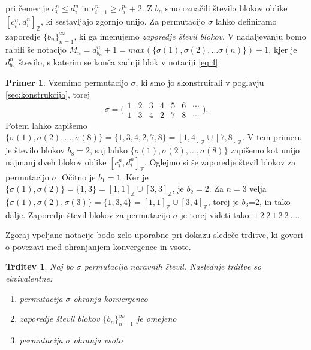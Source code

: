 \documentclass[12pt,a4paper,reqno]{amsart}
\theoremstyle{definition} %
\newtheorem{primer}[definicija]{Primer}
\theoremstyle{plain} %
\newtheorem{trditev}[definicija]{Trditev}
\newcommand{\Z}{\mathbb Z}
\begin{document}
pri čemer je $c^n_i \leq d^n_i$ in $c^n_{i+1} \geq d^n_i +2$. Z $b_n$ smo označili število blokov oblike $[c^n_i, d^n_i]_{\Z}$, ki sestavljajo zgornjo unijo. Za permutacijo $\sigma$ lahko definiramo zaporedje $\{b_n\}^{\infty}_{n=1}$, ki ga imenujemo \emph{zaporedje števil blokov}. %
V nadaljevanju bomo rabili še notacijo $M_n=d^n_{b_n}+1=max(\{ \sigma (1), \sigma (2), \ldots \sigma (n) \})+1$, kjer je $d^n_{b_n}$ število, s katerim se konča zadnji blok v notaciji \ref{eq:4}.

\begin{primer}
Vzemimo permutacijo $\sigma$, ki smo jo skonstruirali v poglavju \ref{sec:konstrukcija}, torej $$\sigma = \bigg(\begin{matrix}
    1 & 2 & 3 & 4 & 5 & 6 & \cdots   \\   1 & 3 & 4 & 2 & 7 & 8 & \cdots
  \end{matrix}\bigg).$$ Potem lahko zapišemo $\{\sigma(1), \sigma(2), \ldots, \sigma(8) \} = \{ 1,3,4,2,7,8\} = [1,4]_{\Z} \cup [7,8]_{\Z}$. V tem primeru je število blokov $b_8=2$, saj lahko $\{\sigma(1), \sigma(2), \ldots, \sigma(8) \}$ zapišemo kot unijo najmanj dveh blokov oblike  $[c^n_i, d^n_i]_{\Z}$.
Oglejmo si še zaporedje števil blokov za permutacijo $\sigma$. Očitno je $b_1=1$. Ker je $\{\sigma(1), \sigma(2) \} = \{ 1,3\} = [1,1]_{\Z} \cup [3,3]_{\Z}$, je $b_2=2$. Za $n=3$ velja $\{\sigma(1), \sigma(2), \sigma(3) \} = \{ 1,3,4\} = [1,1]_{\Z} \cup [3,4]_{\Z}$, torej je $b_3$=2, in tako dalje. Zaporedje števil blokov za permutacijo $\sigma$ je torej videti tako: $1\:2\:2\:1\:2\:2\:\ldots$.
\end{primer}

Zgoraj vpeljane notacije bodo zelo uporabne pri dokazu sledeče trditve, ki govori o povezavi med ohranjanjem konvergence in vsote.

\begin{trditev}
Naj bo $\sigma$ permutacija naravnih števil. Naslednje trditve so ekvivalentne:
\begin{enumerate}
\item permutacija $\sigma$ ohranja konvergenco \label{itm:1}
\item zaporedje števil blokov $\{b_n\}^{\infty}_{n=1}$ je omejeno \label{itm:2}
\item permutacija $\sigma$ ohranja vsoto \label{itm:3}
\end{enumerate}
\end{trditev}
\end{document}
